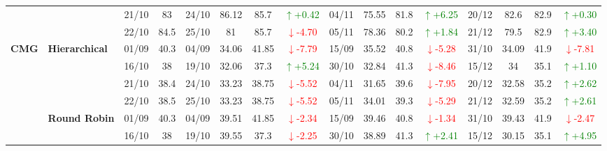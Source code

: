 \documentclass{ieeeaccess}
\begin{document}
{\begin{longtable}{llcc|cccc|cccc|cccc}
&
& 21/10 & 83 & 24/10 & 86.12 & 85.7 & \textcolor{green}{\(\uparrow\)+0.42} & 04/11 & 75.55 & 81.8 & \textcolor{green}{\(\uparrow\)+6.25} & 20/12 & 82.6 & 82.9 & \textcolor{green}{\(\uparrow\)+0.30} \\

&
& 22/10 & 84.5 & 25/10 & 81 & 85.7 & \textcolor{red}{\(\downarrow\)-4.70} & 05/11 & 78.36 & 80.2 & \textcolor{green}{\(\uparrow\)+1.84} & 21/12 & 79.5 & 82.9 & \textcolor{green}{\(\uparrow\)+3.40} \\




\midrule


\multirow{12}{*}{\textbf{CMG}} 
& \textbf{Hierarchical}
& 01/09 & 40.3 & 04/09 & 34.06 & 41.85 & \textcolor{red}{\(\downarrow\)-7.79} & 15/09 & 35.52 & 40.8 & \textcolor{red}{\(\downarrow\)-5.28} & 31/10 & 34.09 & 41.9 & \textcolor{red}{\(\downarrow\)-7.81} \\

& 
& 16/10 & 38 & 19/10 & 32.06 & 37.3 & \textcolor{green}{\(\uparrow\)+5.24} & 30/10 & 32.84 & 41.3 & \textcolor{red}{\(\downarrow\)-8.46} & 15/12 & 34 & 35.1 & \textcolor{green}{\(\uparrow\)+1.10} \\

& 
& 21/10 & 38.4 & 24/10 & 33.23 & 38.75 & \textcolor{red}{\(\downarrow\)-5.52} & 04/11 & 31.65 & 39.6 & \textcolor{red}{\(\downarrow\)-7.95} & 20/12 & 32.58 & 35.2 & \textcolor{green}{\(\uparrow\)+2.62} \\

&
& 22/10 & 38.5 & 25/10 & 33.23 & 38.75 & \textcolor{red}{\(\downarrow\)-5.52} & 05/11 & 34.01 & 39.3 & \textcolor{red}{\(\downarrow\)-5.29} & 21/12 & 32.59 & 35.2 & \textcolor{green}{\(\uparrow\)+2.61} \\
\cmidrule(lr){2-16}


& \textbf{Round Robin}
& 01/09 & 40.3 & 04/09 & 39.51 & 41.85 & \textcolor{red}{\(\downarrow\)-2.34} & 15/09 & 39.46 & 40.8 & \textcolor{red}{\(\downarrow\)-1.34} & 31/10 & 39.43 & 41.9 & \textcolor{red}{\(\downarrow\)-2.47} \\

& 
& 16/10 & 38 & 19/10 & 39.55 & 37.3 & \textcolor{red}{\(\downarrow\)-2.25} & 30/10 & 38.89 & 41.3 & \textcolor{green}{\(\uparrow\)+2.41} & 15/12 & 30.15 & 35.1 & \textcolor{green}{\(\uparrow\)+4.95} \\


\end{longtable}}
\end{document}
